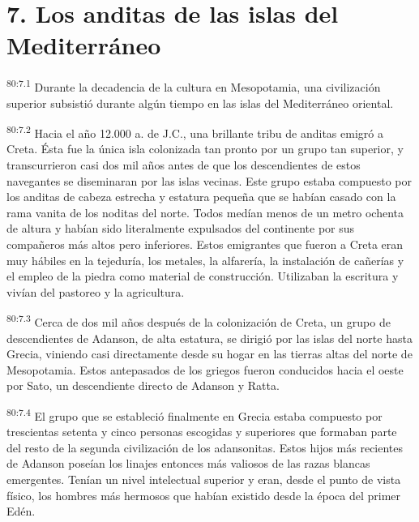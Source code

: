 \section*{7. Los anditas de las islas del Mediterráneo}
\par
\textsuperscript{80:7.1} Durante la decadencia de la cultura en Mesopotamia, una civilización superior subsistió durante algún tiempo en las islas del Mediterráneo oriental.

\par
\textsuperscript{80:7.2} Hacia el año 12.000 a. de J.C., una brillante tribu de anditas emigró a Creta. Ésta fue la única isla colonizada tan pronto por un grupo tan superior, y transcurrieron casi dos mil años antes de que los descendientes de estos navegantes se diseminaran por las islas vecinas. Este grupo estaba compuesto por los anditas de cabeza estrecha y estatura pequeña que se habían casado con la rama vanita de los noditas del norte. Todos medían menos de un metro ochenta de altura y habían sido literalmente expulsados del continente por sus compañeros más altos pero inferiores. Estos emigrantes que fueron a Creta eran muy hábiles en la tejeduría, los metales, la alfarería, la instalación de cañerías y el empleo de la piedra como material de construcción. Utilizaban la escritura y vivían del pastoreo y la agricultura.

\par
\textsuperscript{80:7.3} Cerca de dos mil años después de la colonización de Creta, un grupo de descendientes de Adanson, de alta estatura, se dirigió por las islas del norte hasta Grecia, viniendo casi directamente desde su hogar en las tierras altas del norte de Mesopotamia. Estos antepasados de los griegos fueron conducidos hacia el oeste por Sato, un descendiente directo de Adanson y Ratta.

\par
\textsuperscript{80:7.4} El grupo que se estableció finalmente en Grecia estaba compuesto por trescientas setenta y cinco personas escogidas y superiores que formaban parte del resto de la segunda civilización de los adansonitas. Estos hijos más recientes de Adanson poseían los linajes entonces más valiosos de las razas blancas emergentes. Tenían un nivel intelectual superior y eran, desde el punto de vista físico, los hombres más hermosos que habían existido desde la época del primer Edén.

